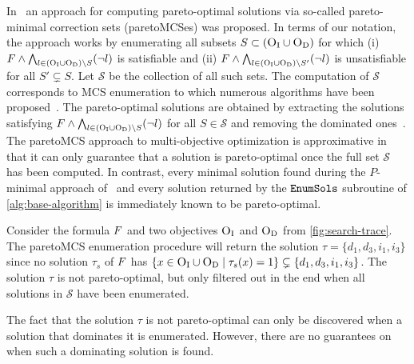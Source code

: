 In~\textcite{DBLP:conf/ijcai/Terra-NevesLM18a,DBLP:conf/aaai/Terra-NevesLM18,DBLP:conf/ijcai/Terra-NevesLM18} an approach for computing pareto-optimal solutions via so-called pareto-minimal correction sets (paretoMCSes) was proposed.
In terms of our notation, the approach works by enumerating all subsets $S \subset  (\textsc{O}_{\text{I}} \cup \textsc{O}_{\text{D}})$ for which (i) $F \land \bigwedge_{l \in  (\textsc{O}_{\text{I}} \cup \textsc{O}_{\text{D}}) \setminus S} (\lnot l)$ is satisfiable and (ii) $F \land \bigwedge_{l \in  (\textsc{O}_{\text{I}} \cup \textsc{O}_{\text{D}}) \setminus S'} (\lnot l)$ is unsatisfiable for all $S' \subsetneq S$.
Let $\mathcal{S}$ be the collection of all such sets.
The computation of $\mathcal{S}$ corresponds to MCS enumeration to which numerous algorithms have been proposed~\autocite{DBLP:conf/lpar/BendikC20,DBLP:conf/hvc/MorgadoLM12,DBLP:conf/sat/PrevitiMJM17}.
The pareto-optimal solutions are obtained by extracting the solutions satisfying $F \land \bigwedge_{l \in  (\textsc{O}_{\text{I}} \cup \textsc{O}_{\text{D}}) \setminus S} (\lnot l)$ for all $S \in \mathcal{S}$ and removing the dominated ones~\cite{DBLP:conf/ijcai/Terra-NevesLM18a}.
The paretoMCS approach to multi-objective optimization is approximative in that it can only guarantee that a solution is pareto-optimal once the full set $\mathcal{S}$ has been computed.
In contrast, every minimal solution found during the $P$-minimal approach of~\textcite{DBLP:conf/cp/SohBTB17} and every solution returned by the $\texttt{EnumSols}$ subroutine of \cref{alg:base-algorithm} is immediately known to be pareto-optimal.
\begin{example}\label{ex:MCS}
  Consider the formula $F$ and two objectives $\textsc{O}_{\text{I}}$ and $\textsc{O}_{\text{D}}$ from \cref{fig:search-trace}.
  The paretoMCS enumeration procedure will return the solution $\tau = \{d_1, d_3, i_1, i_3\}$ since no solution $\tau_s$ of $F$ has $\{x \in \textsc{O}_{\text{I}} \cup \textsc{O}_{\text{D}} \mid  \tau_s(x) = 1\} \subsetneq \{d_1, d_3, i_1, i_3\}$.
  The solution $\tau$ is not pareto-optimal, but only filtered out in the end when all solutions in $\mathcal{S}$ have been enumerated.
\end{example}
The fact that the solution $\tau$ is not pareto-optimal can only be discovered when a solution that dominates it is enumerated. 
However, there are no guarantees on when such a dominating solution is found. 

